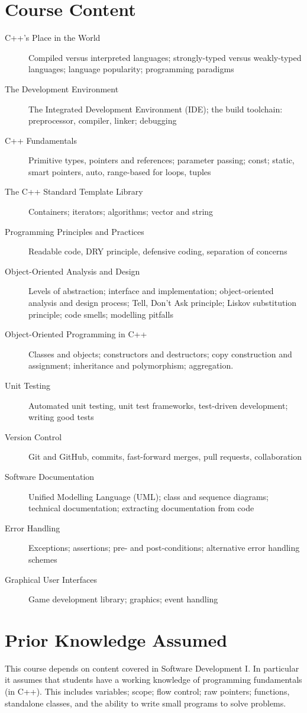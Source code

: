 \documentclass[11pt]{eie-cbo}
\begin{document}
\section{Course Content}\label{sec:content}
\begin{description}
		\item [C++'s Place in the World] Compiled versus interpreted languages; strongly-typed versus weakly-typed languages; language popularity; programming paradigms
		\item [The Development Environment] The Integrated Development Environment (IDE); the build toolchain: preprocessor, compiler, linker; debugging
		\item [C++ Fundamentals] Primitive types, pointers and references; parameter passing; const; static, smart pointers, auto, range-based for loops, tuples
		\item [The C++ Standard Template Library]
		Containers; iterators; algorithms; vector and string
		\item [Programming Principles and Practices]
		Readable code, DRY principle, defensive coding, separation of concerns
		\item [Object-Oriented Analysis and Design]
		Levels of abstraction; interface and implementation; object-oriented analysis and design process; Tell, Don’t Ask principle; Liskov substitution principle; code smells; modelling pitfalls
		\item [Object-Oriented Programming in C++]
		Classes and objects; constructors and destructors; copy construction and assignment; inheritance and polymorphism; aggregation.
		\item [Unit Testing]
		Automated unit testing, unit test frameworks, test-driven development; writing good tests
		\item [Version Control]
		Git and GitHub, commits, fast-forward merges, pull requests, collaboration
		\item [Software Documentation]
		Unified Modelling Language (UML); class and sequence diagrams; technical documentation; extracting documentation from code
		\item [Error Handling]
		Exceptions; assertions; pre- and post-conditions; alternative error handling schemes
		\item [Graphical User Interfaces]
		Game development library; graphics; event handling
\end{description}	

\section{Prior Knowledge Assumed}\label{sec:prior}
This course depends on content covered in Software Development I. In particular it assumes that students have a working knowledge of programming fundamentals (in C++). This includes variables; scope; flow control; raw pointers; functions, standalone classes, and the ability to write small programs to solve problems.
\end{document}
